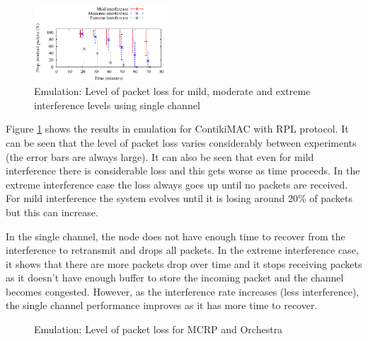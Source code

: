 \begin{figure}
\centering
\includegraphics[width=0.45\textwidth]{figures/single_channel.pdf}
\caption{Emulation: Level of packet loss for mild, moderate and extreme interference levels using single channel}
\label{fig:interference}
\end{figure}

Figure \ref{fig:interference} shows the results in emulation for ContikiMAC with RPL protocol. It can be seen that the level of packet loss varies considerably between experiments (the error bars are always large). It can also be seen that even for mild interference there is considerable loss and this gets worse as time proceeds. In the extreme interference case the loss always goes up until no packets are received. For mild interference the system evolves until it is losing around 20\% of packets but this can increase.

In the single channel, the node does not have enough time to recover from the interference to retransmit and drops all packets. In the extreme interference case, it shows that there are more packets drop over time and it stops receiving packets as it doesn't have enough buffer to store the incoming packet and the channel becomes congested. However, as the interference rate increases (less interference), the single channel performance improves as it has more time to recover.

\begin{figure}
\centering
{}
\caption{Emulation: Level of packet loss for MCRP and Orchestra}
\label{fig:layouts}
\end{figure}


